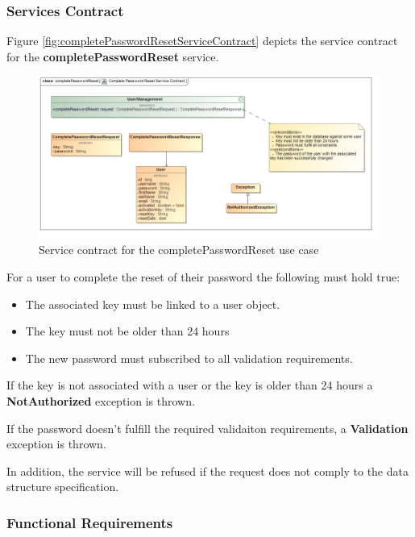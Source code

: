 \subsubsection{Services Contract}
Figure \ref{fig:completePasswordResetServiceContract} depicts the service contract for the \textbf{completePasswordReset} service.

\begin{figure}[H]
  \begin{center}
  \includegraphics[scale=0.55]{../Diagrams and Charts/Users/Complete Password Reset Service Contract.jpg}
  \caption{Service contract for the completePasswordReset use case}
  \end{center}
  \label{fig:completePasswordResetServicesContract}
\end{figure}

For a user to complete the reset of their password the following must hold true:
\begin{itemize}
	\item The associated key must be linked to a user object.
	\item The key must not be older than 24 hours
	\item The new password must subscribed to all validation requirements.
\end{itemize}

If the key is not associated with a user or the key is older than 24 hours a \textbf{NotAuthorized} exception is thrown.

If the password doesn't fulfill the required validaiton requirements, a \textbf{Validation} exception is thrown.

In addition, the service will be refused if the request does not comply to the data structure specification.

\subsubsection{Functional Requirements}

